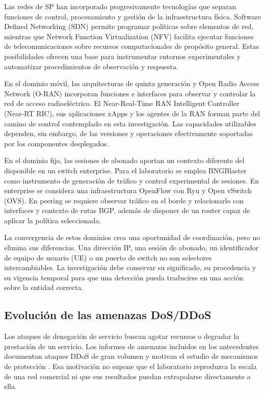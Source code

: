 Las redes de SP han incorporado progresivamente tecnologías que separan funciones de control, procesamiento y gestión de la infraestructura física. Software Defined Networking (SDN) permite programar políticas sobre elementos de red, mientras que Network Function Virtualization (NFV) facilita ejecutar funciones de telecomunicaciones sobre recursos computacionales de propósito general. Estas posibilidades ofrecen una base para instrumentar entornos experimentales y automatizar procedimientos de observación y respuesta.

En el dominio móvil, las arquitecturas de quinta generación y Open Radio Access Network (O-RAN) incorporan funciones e interfaces para observar y controlar la red de acceso radioeléctrico. El Near-Real-Time RAN Intelligent Controller (Near-RT RIC), sus aplicaciones xApps y los agentes de la RAN forman parte del camino de control contemplado en esta investigación. Las capacidades utilizables dependen, sin embargo, de las versiones y operaciones efectivamente soportadas por los componentes desplegados.

En el dominio fijo, las sesiones de abonado aportan un contexto diferente del disponible en un switch enterprise. Para el laboratorio se emplea BNGBlaster como instrumento de generación de tráfico y control experimental de sesiones. En enterprise se considera una infraestructura OpenFlow con Ryu y Open vSwitch (OVS). En peering se requiere observar tráfico en el borde y relacionarlo con interfaces y contexto de rutas BGP, además de disponer de un router capaz de aplicar la política seleccionada.

La convergencia de estos dominios crea una oportunidad de coordinación, pero no elimina sus diferencias. Una dirección IP, una sesión de abonado, un identificador de equipo de usuario (UE) o un puerto de switch no son selectores intercambiables. La investigación debe conservar su significado, su procedencia y su vigencia temporal para que una detección pueda traducirse en una acción sobre la entidad correcta.

\subsection{Evolución de las amenazas DoS/DDoS}

Los ataques de denegación de servicio buscan agotar recursos o degradar la prestación de un servicio. Los informes de amenazas incluidos en los antecedentes documentan ataques DDoS de gran volumen y motivan el estudio de mecanismos de protección \cite{Cloudflare_2024,Cloudflare_2025,NETSCOUT_2024}. Esa motivación no supone que el laboratorio reproduzca la escala de una red comercial ni que sus resultados puedan extrapolarse directamente a ella.

